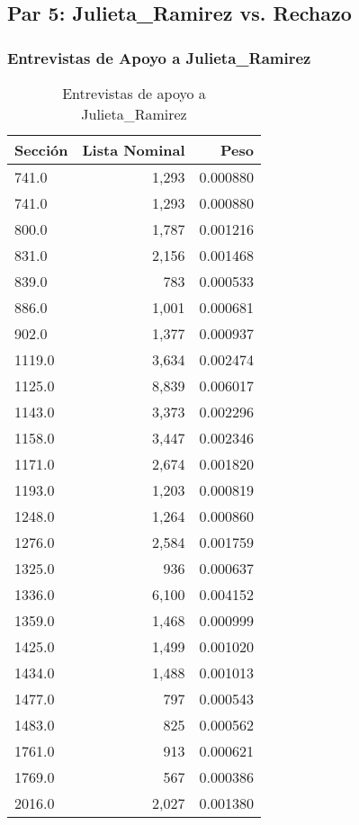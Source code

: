 \documentclass[a4paper,12pt]{article}
\begin{document}
\subsection*{Par 5: Julieta_Ramirez vs. Rechazo}

\subsubsection*{Entrevistas de Apoyo a Julieta_Ramirez}
\begin{table}[h]
\centering
\begin{tabular}{lrr}
\toprule
Sección & Lista Nominal & Peso \\ \midrule
741.0 & 1,293 & 0.000880 \\ 
741.0 & 1,293 & 0.000880 \\ 
800.0 & 1,787 & 0.001216 \\ 
831.0 & 2,156 & 0.001468 \\ 
839.0 & 783 & 0.000533 \\ 
886.0 & 1,001 & 0.000681 \\ 
902.0 & 1,377 & 0.000937 \\ 
1119.0 & 3,634 & 0.002474 \\ 
1125.0 & 8,839 & 0.006017 \\ 
1143.0 & 3,373 & 0.002296 \\ 
1158.0 & 3,447 & 0.002346 \\ 
1171.0 & 2,674 & 0.001820 \\ 
1193.0 & 1,203 & 0.000819 \\ 
1248.0 & 1,264 & 0.000860 \\ 
1276.0 & 2,584 & 0.001759 \\ 
1325.0 & 936 & 0.000637 \\ 
1336.0 & 6,100 & 0.004152 \\ 
1359.0 & 1,468 & 0.000999 \\ 
1425.0 & 1,499 & 0.001020 \\ 
1434.0 & 1,488 & 0.001013 \\ 
1477.0 & 797 & 0.000543 \\ 
1483.0 & 825 & 0.000562 \\ 
1761.0 & 913 & 0.000621 \\ 
1769.0 & 567 & 0.000386 \\ 
2016.0 & 2,027 & 0.001380 \\ 
\bottomrule
\end{tabular}
\caption{Entrevistas de apoyo a Julieta_Ramirez}
\end{table}
\end{document}

